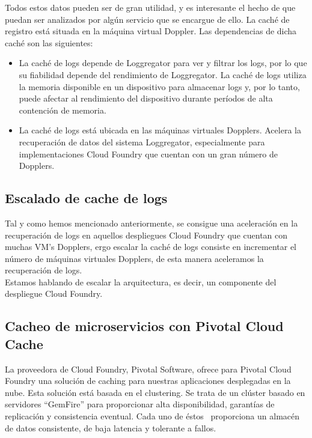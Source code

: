 \documentclass[a4paper,11pt]{article}
\begin{document}
Todos estos datos pueden ser de gran utilidad, y es interesante el hecho de que puedan ser analizados por algún servicio que se encargue de ello.
La caché de registro está situada en la máquina virtual Doppler. Las dependencias de dicha caché son las siguientes:
\begin{itemize}
\item La caché de logs depende de Loggregator para ver y filtrar los logs, por lo que su fiabilidad depende del rendimiento de Loggregator. La caché de logs utiliza la memoria disponible en un dispositivo para almacenar logs y, por lo tanto, puede afectar al rendimiento del dispositivo durante períodos de alta contención de memoria.
\item La caché de logs está ubicada en las máquinas virtuales Dopplers. Acelera la recuperación de datos del sistema Loggregator, especialmente para implementaciones Cloud Foundry que cuentan con un gran número de Dopplers.
\end{itemize}

\subsection{Escalado de cache de logs}
Tal y como hemos mencionado anteriormente, se consigue una aceleración en la recuperación de logs en aquellos despliegues Cloud Foundry que cuentan con muchas VM’s Dopplers, ergo escalar la caché de logs consiste en incrementar el número de máquinas virtuales Dopplers, de esta manera aceleramos la recuperación de logs.\\
Estamos hablando de escalar la arquitectura, es decir, un componente del despliegue Cloud Foundry.

\subsection{Cacheo de microservicios con Pivotal Cloud Cache}
La proveedora de Cloud Foundry, Pivotal Software, ofrece para Pivotal Cloud Foundry una solución de caching para nuestras aplicaciones desplegadas en la nube. Esta solución está basada en el clustering. Se trata de un clúster basado en servidores ``GemFire'' para proporcionar alta disponibilidad, garantías de replicación y consistencia eventual. Cada uno de éstos   proporciona un almacén de datos consistente, de baja latencia y tolerante a fallos.
\end{document}

